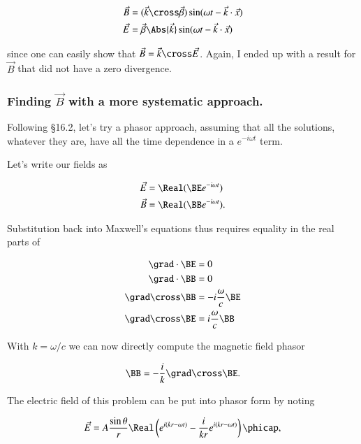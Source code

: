\begin{align}\label{eqn:relElectroDynProblemSet4:480}
\vec{B} &= (\vec{k} \cross \vec{\beta}) \sin(\omega t - \vec{k} \cdot \vec{x}) \\
\vec{E} &= \vec{\beta} \Abs{\vec{k}} \sin(\omega t - \vec{k} \cdot \vec{x})
\end{align}

since one can easily show that $\vec{B} = \vec{k} \cross \vec{E}$.  Again, I ended up with a result for $\vec{B}$ that did not have a zero divergence.

\subsubsection{Finding $\vec{B}$ with a more systematic approach.}

Following \cite{jackson1975cew} \S 16.2, let's try a phasor approach, assuming that all the solutions, whatever they are, have all the time dependence in a $e^{-i\omega t}$ term.

Let's write our fields as

\begin{align}\label{eqn:relElectroDynProblemSet4:500}
\vec{E} &= \Real (\BE e^{-i \omega t}) \\
\vec{B} &= \Real (\BB e^{-i \omega t}).
\end{align}

Substitution back into Maxwell's equations thus requires equality in the real parts of

\begin{align}\label{eqn:relElectroDynProblemSet4:520}
\grad \cdot \BE &= 0 \\
\grad \cdot \BB &= 0 \\
\grad \cross \BB &= - i \frac{\omega}{c} \BE \\
\grad \cross \BE &= i \frac{\omega}{c} \BB
\end{align}

With $k = \omega/c$ we can now directly compute the magnetic field phasor

\begin{equation}\label{eqn:relElectroDynProblemSet4:540}
\BB = -\frac{i}{k} \grad \cross \BE.
\end{equation}

The electric field of this problem can be put into phasor form by noting

\begin{equation}\label{eqn:relElectroDynProblemSet4:560}
\vec{E} = A \frac{\sin\theta}{r} \Real \left( e^{i (k r - \omega t)} - \frac{i}{k r} e^{i(k r - \omega t)} \right) \phicap,
\end{equation}

